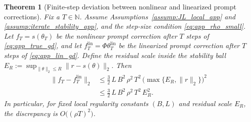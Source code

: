 \documentclass{article}
\theoremstyle{plain}
\newtheorem{theorem}{Theorem}[section]
\theoremstyle{definition}
\theoremstyle{remark}
\begin{document}
\begin{theorem}[Finite-step deviation between nonlinear and linearized prompt corrections]\label{thm:finite_step_deviation_prompt_app}
Fix a $T\in\mathbb{N}$. Assume Assumptions~\ref{assump:JL_local_app} and \ref{assump:iterate_stability_app},
and the step-size condition \eqref{eq:app_rho_small}. Let $f_T=s(\theta_T)$ be the nonlinear prompt correction after
$T$ steps of \eqref{eq:app_true_gd}, and let $f_T^{\mathrm{lin}}=\Phi\theta_T^{\mathrm{lin}}$ be the linearized prompt
correction after $T$ steps of \eqref{eq:app_lin_gd}. Define the residual scale inside the stability ball $E_R:=\sup_{\|\theta\|_2\le R}\|r-s(\theta)\|_2.$
Then
\begin{align}
\|f_T-f_T^{\mathrm{lin}}\|_2 &\le \frac{3}{2}\,L\,B^2\,\rho^2\,T^2\, \bigl(\max\{E_R,\|r\|_2\}\bigr)^2 \\
&\le \frac{3}{2}\,L\,B^2\,\rho^2\,T^2\,E_R^2.
\label{eq:app_finite_step_deviation_bound}
\end{align}
In particular, for fixed local regularity constants $(B,L)$ and residual scale $E_R$, the discrepancy is
$O\bigl((\rho T)^2\bigr)$.
\end{theorem}
\end{document}
